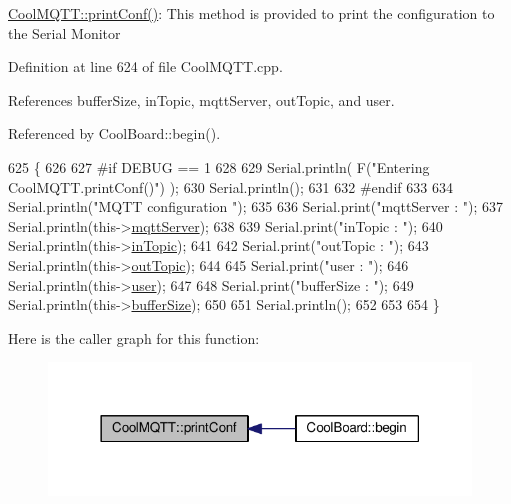 \hyperlink{classCoolMQTT_a40553a0ad4b5ecf1cb4411ab54ca85fb}{Cool\+M\+Q\+T\+T\+::print\+Conf()}\+: This method is provided to print the configuration to the Serial Monitor 

Definition at line 624 of file Cool\+M\+Q\+T\+T.\+cpp.



References buffer\+Size, in\+Topic, mqtt\+Server, out\+Topic, and user.



Referenced by Cool\+Board\+::begin().


\begin{DoxyCode}
625 \{
626 
627 \textcolor{preprocessor}{#if DEBUG == 1 }
628 
629     Serial.println( F(\textcolor{stringliteral}{"Entering CoolMQTT.printConf()"}) );
630     Serial.println();   
631 
632 \textcolor{preprocessor}{#endif}
633     
634     Serial.println(\textcolor{stringliteral}{"MQTT configuration "});
635 
636     Serial.print(\textcolor{stringliteral}{"mqttServer : "});
637     Serial.println(this->\hyperlink{classCoolMQTT_ab8bb951f87ddbf92db74c2ad16a3e53e}{mqttServer});
638 
639     Serial.print(\textcolor{stringliteral}{"inTopic : "});
640     Serial.println(this->\hyperlink{classCoolMQTT_a4492f52a441e83cc5151010317fdb52d}{inTopic});
641 
642     Serial.print(\textcolor{stringliteral}{"outTopic : "});
643     Serial.println(this->\hyperlink{classCoolMQTT_a109c786a17b463f9eeba046194279522}{outTopic});
644 
645     Serial.print(\textcolor{stringliteral}{"user : "});
646     Serial.println(this->\hyperlink{classCoolMQTT_a8cd47e45d457f908d4b4390b35aaee83}{user});
647 
648     Serial.print(\textcolor{stringliteral}{"bufferSize : "});
649     Serial.println(this->\hyperlink{classCoolMQTT_a7f3cf26b51d6770f216e42c5ef13ca9f}{bufferSize});
650 
651     Serial.println();
652 
653 
654 \}
\end{DoxyCode}
Here is the caller graph for this function\+:
\nopagebreak
\begin{figure}[H]
\begin{center}
\leavevmode
\includegraphics[width=318pt]{classCoolMQTT_a40553a0ad4b5ecf1cb4411ab54ca85fb_icgraph}
\end{center}
\end{figure}
\mbox{\label{classCoolMQTT_ace977b3e90ab14b1199fe5c4fb0a13ec}} 
